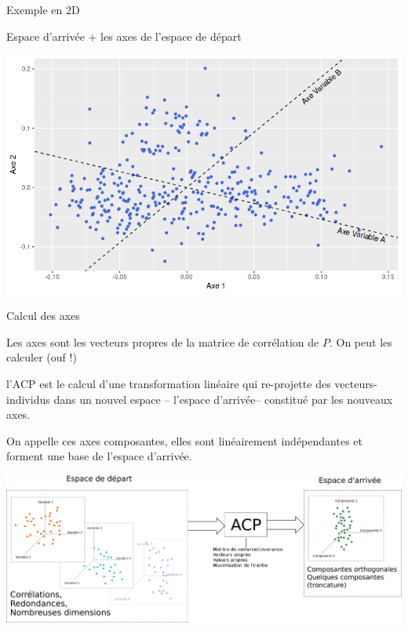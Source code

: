 \documentclass{beamer}
\begin{document}
\begin{frame}{Exemple en 2D}

Espace d'arrivée + les axes de l'espace de départ

\centering
\includegraphics[width=\textwidth,keepaspectratio]{img/exemple_2D_arrivee_axes.png}

\end{frame}








\begin{frame}{Calcul des axes}

Les \alert{axes} sont les \alert{vecteurs propres} de la matrice de corrélation de $P$.
On peut les calculer (ouf !)

\medskip

l'ACP est le calcul d’une transformation linéaire qui \alert{re-projette} des vecteurs-individus dans un nouvel \alert{espace} -- l'espace d'arrivée--  constitué par les \alert{nouveaux axes}.

\medskip

On appelle ces axes \alert{composantes}, elles sont \alert{linéairement indépendantes} et forment une \alert{base} de l'espace d'arrivée.
\end{frame}




\begin{frame}

 \centering
\colorbox{white}{\includegraphics[width=\textwidth,keepaspectratio]{img/schema_ACP.png}}


\end{frame}
\end{document}
